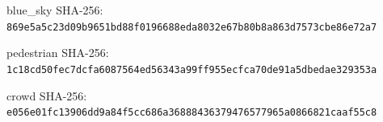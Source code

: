 \par\begingroup\setlength{\parskip}{2pt}
blue\_sky SHA-256: \texttt{869e5a5c23d09b9651bd88f0196688ed}\allowbreak\texttt{a8032e67b80b8a863d7573cbe86e72a7}\par
pedestrian SHA-256: \texttt{1c18cd50fec7dcfa6087564ed56343a9}\allowbreak\texttt{9ff955ecfca70de91a5dbedae329353a}\par
crowd SHA-256: \texttt{e056e01fc13906dd9a84f5cc686a3688}\allowbreak\texttt{8436379476577965a0866821caaf55c8}\par
\endgroup
